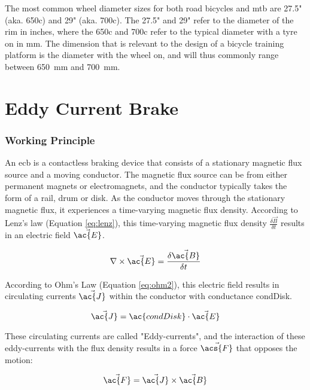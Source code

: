The most common wheel diameter sizes for both road bicycles and \ac{mtb} are 27.5" (aka. 650c) and 29" (aka. 700c). The 27.5" and 29" refer to the diameter of the rim in inches, where the 650c and 700c refer to the typical diameter with a tyre on in \si{\milli\meter}. The dimension that is relevant to the design of a bicycle training platform is the diameter with the wheel on, and will thus commonly range between \SI{650}{\milli\meter} and \SI{700}{\milli\meter}. \citep{Montague:2019}

\section{Eddy Current Brake}

\subsubsection{Working Principle}

An \acf{ecb} is a contactless braking device that consists of a stationary magnetic flux source and a moving conductor. The magnetic flux source can be from either permanent magnets or electromagnets, and the conductor typically takes the form of a rail, drum or disk. As the conductor moves through the stationary magnetic flux, it experiences a time-varying magnetic flux density. According to Lenz's law (Equation \ref{eq:lenz}), this time-varying magnetic flux density $\frac{\delta\vec{B}}{\delta t}$ results in an electric field $\vec{\ac{E}}$.

\begin{equation}
	\nabla \times \vec{\ac{E}} = \frac{\delta\vec{\ac{B}}}{\delta t}
	\label{eq:lenz}
\end{equation}

According to Ohm's Law (Equation \ref{eq:ohm2}), this electric field results in circulating currents $\vec{\ac{J}}$ within the conductor with conductance \acs{condDisk}.

\begin{equation}
	\vec{\ac{J}} = \ac{condDisk} \cdot \vec{\ac{E}}
	\label{eq:ohm2}
\end{equation}

These circulating currents are called "Eddy-currents", and the interaction of these eddy-currents with the flux density results in a force $\vec{\acs{F}}$ that opposes the motion: \citep{Gay:2005}

\begin{equation}
	\vec{\ac{F}} = \vec{\ac{J}} \times \vec{\ac{B}}
	\label{eq:force}
\end{equation}


